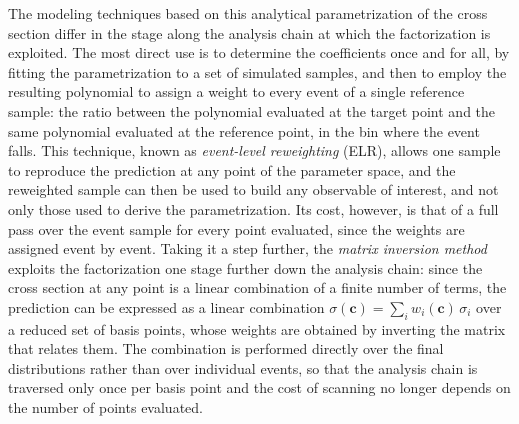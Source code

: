 The modeling techniques based on this analytical parametrization of the cross section differ in the stage along the analysis chain at which the factorization is exploited. The most direct use is to determine the coefficients once and for all, by fitting the parametrization to a set of simulated samples, and then to employ the resulting polynomial to assign a weight to every event of a single reference sample: the ratio between the polynomial evaluated at the target point and the same polynomial evaluated at the reference point, in the bin where the event falls. This technique, known as \textit{event-level reweighting} (ELR), allows one sample to reproduce the prediction at any point of the parameter space, and the reweighted sample can then be used to build any observable of interest, and not only those used to derive the parametrization. Its cost, however, is that of a full pass over the event sample for every point evaluated, since the weights are assigned event by event. Taking it a step further, the \textit{matrix inversion method} exploits the factorization one stage further down the analysis chain: since the cross section at any point is a linear combination of a finite number of terms, the prediction can be expressed as a linear combination $\sigma(\mathbf{c}) = \sum_i w_i(\mathbf{c})\,\sigma_i$ over a reduced set of basis points, whose weights are obtained by inverting the matrix that relates them. The combination is performed directly over the final distributions rather than over individual events, so that the analysis chain is traversed only once per basis point and the cost of scanning no longer depends on the number of points evaluated.


